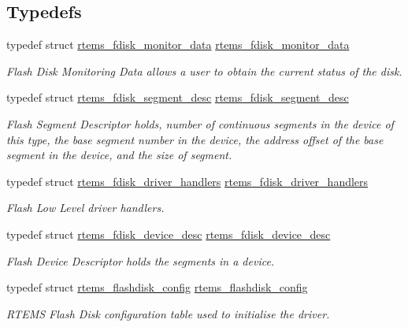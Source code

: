 \subsection*{Typedefs}
\begin{DoxyCompactItemize}
\item 
\mbox{\label{group__RTEMSFDisk_ga3cbff7dffdac7250af3b513a24601f91}} 
typedef struct \mbox{\hyperlink{structrtems__fdisk__monitor__data}{rtems\+\_\+fdisk\+\_\+monitor\+\_\+data}} \mbox{\hyperlink{group__RTEMSFDisk_ga3cbff7dffdac7250af3b513a24601f91}{rtems\+\_\+fdisk\+\_\+monitor\+\_\+data}}
\begin{DoxyCompactList}\small\item\em Flash Disk Monitoring Data allows a user to obtain the current status of the disk. \end{DoxyCompactList}\item 
typedef struct \mbox{\hyperlink{structrtems__fdisk__segment__desc}{rtems\+\_\+fdisk\+\_\+segment\+\_\+desc}} \mbox{\hyperlink{group__RTEMSFDisk_ga0af0a297f5876583c22f099ac54688c7}{rtems\+\_\+fdisk\+\_\+segment\+\_\+desc}}
\begin{DoxyCompactList}\small\item\em Flash Segment Descriptor holds, number of continuous segments in the device of this type, the base segment number in the device, the address offset of the base segment in the device, and the size of segment. \end{DoxyCompactList}\item 
typedef struct \mbox{\hyperlink{structrtems__fdisk__driver__handlers}{rtems\+\_\+fdisk\+\_\+driver\+\_\+handlers}} \mbox{\hyperlink{group__RTEMSFDisk_ga3e36a0fb2b70165104f1d988f33cd029}{rtems\+\_\+fdisk\+\_\+driver\+\_\+handlers}}
\begin{DoxyCompactList}\small\item\em Flash Low Level driver handlers. \end{DoxyCompactList}\item 
typedef struct \mbox{\hyperlink{structrtems__fdisk__device__desc}{rtems\+\_\+fdisk\+\_\+device\+\_\+desc}} \mbox{\hyperlink{group__RTEMSFDisk_ga4e1cf210089a66216e739c7ccd3ea84e}{rtems\+\_\+fdisk\+\_\+device\+\_\+desc}}
\begin{DoxyCompactList}\small\item\em Flash Device Descriptor holds the segments in a device. \end{DoxyCompactList}\item 
typedef struct \mbox{\hyperlink{structrtems__flashdisk__config}{rtems\+\_\+flashdisk\+\_\+config}} \mbox{\hyperlink{group__RTEMSFDisk_ga8d4fff797358538766b3bb13be596811}{rtems\+\_\+flashdisk\+\_\+config}}
\begin{DoxyCompactList}\small\item\em R\+T\+E\+MS Flash Disk configuration table used to initialise the driver. \end{DoxyCompactList}\end{DoxyCompactItemize}

